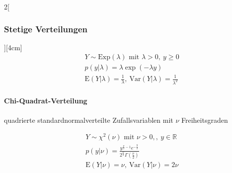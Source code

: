 \documentclass[8pt]{extarticle}
\begin{document}
\begin{multicols}{2}[\subsubsection{Stetige Verteilungen}][4cm]
    \begin{align*}
    & Y \sim \mathrm{Exp}(\lambda) \text{ mit } \lambda > 0,\: y \geq 0\\
    & p(y|\lambda) = \lambda\exp (-\lambda y) \\
    & \mathrm{E}(Y|\lambda) = \frac{1}{\lambda}, \:
	\mathrm{Var}(Y|\lambda) = \frac{1}{\lambda^2}
  \end{align*}
  
  
  	\paragraph{Chi-Quadrat-Verteilung} quadrierte standardnormalverteilte Zufallsvariablen mit $\nu$ Freiheitsgraden
  
    \begin{align*}
    & Y \sim \chi^2(\nu) \text{ mit } \nu > 0,,\: y \in \mathbb{R}\\
    & p(y|\nu) = \frac{y^{\frac{\nu}{2}-1}e^{-\frac{y}{2}}}{2^{\frac{\nu}{2}}\Gamma \left(\frac{\nu}{2}\right)} \\
    & \mathrm{E}(Y|\nu) = \nu, \:
	\mathrm{Var}(Y|\nu) = 2\nu
  \end{align*}

\end{multicols}
\end{document}
